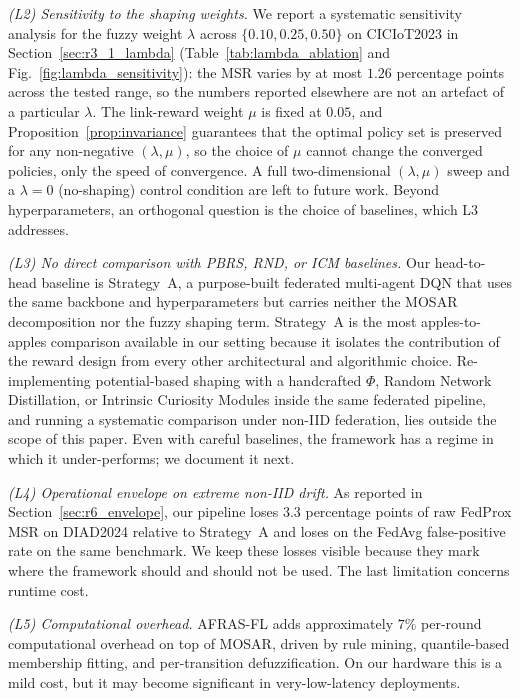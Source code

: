 \documentclass[journal]{IEEEtran}
\begin{document}
\emph{(L2) Sensitivity to the shaping weights.} We report a
systematic sensitivity analysis for the fuzzy weight $\lambda$
across $\{0.10, 0.25, 0.50\}$ on CICIoT2023 in
Section~\ref{sec:r3_1_lambda} (Table~\ref{tab:lambda_ablation} and
Fig.~\ref{fig:lambda_sensitivity}): the MSR varies by at most
$1.26$ percentage points across the tested range, so the numbers
reported elsewhere are not an artefact of a particular $\lambda$.
The link-reward weight $\mu$ is fixed at $0.05$, and
Proposition~\ref{prop:invariance} guarantees that the optimal
policy set is preserved for any non-negative $(\lambda, \mu)$, so
the choice of $\mu$ cannot change the converged policies, only the
speed of convergence. A full two-dimensional $(\lambda, \mu)$
sweep and a $\lambda = 0$ (no-shaping) control condition are left
to future work. Beyond hyperparameters, an orthogonal question is
the choice of baselines, which L3 addresses.

\emph{(L3) No direct comparison with PBRS, RND, or ICM baselines.}
Our head-to-head baseline is Strategy~A, a purpose-built federated
multi-agent DQN that uses the same backbone and hyperparameters
but carries neither the MOSAR decomposition nor the fuzzy shaping
term. Strategy~A is the most apples-to-apples comparison available
in our setting because it isolates the contribution of the reward
design from every other architectural and algorithmic choice.
Re-implementing potential-based shaping with a handcrafted $\Phi$,
Random Network Distillation, or Intrinsic Curiosity Modules inside
the same federated pipeline, and running a systematic comparison
under non-IID federation, lies outside the scope of this paper.
Even with careful baselines, the framework has a regime in which
it under-performs; we document it next.

\emph{(L4) Operational envelope on extreme non-IID drift.} As
reported in Section~\ref{sec:r6_envelope}, our pipeline loses $3.3$
percentage points of raw FedProx MSR on DIAD2024 relative to
Strategy~A and loses on the FedAvg false-positive rate on the same
benchmark. We keep these losses visible because they mark where the
framework should and should not be used. The last limitation
concerns runtime cost.

\emph{(L5) Computational overhead.} AFRAS-FL adds approximately
$7\%$ per-round computational overhead on top of MOSAR, driven by
rule mining, quantile-based membership fitting, and per-transition
defuzzification. On our hardware this is a mild cost, but it may
become significant in very-low-latency deployments.
\end{document}
